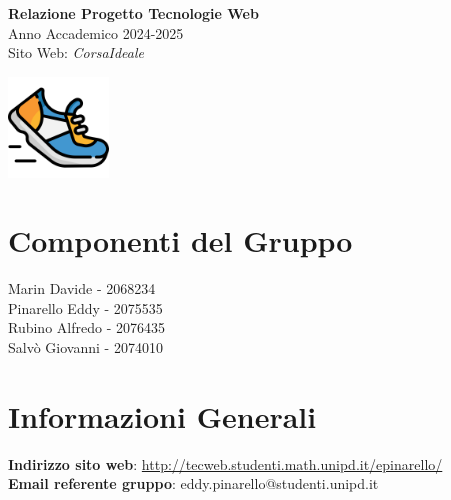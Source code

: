 \documentclass[a4paper, 12pt]{article}
\begin{document}
\begin{titlepage}
\begin{center}
    \vspace*{0.5cm}
    \Huge \textbf{Relazione Progetto Tecnologie Web} \\
    \vspace{0.5cm}
    \Large Anno Accademico 2024-2025\\
    \vspace{1cm}
    \Huge Sito Web: \textit{CorsaIdeale} \\
    \vspace{0.5cm} 

    \includegraphics[width=0.2\textwidth]{logo.png}
\end{center}

\section*{\centering Componenti del Gruppo}
\begin{center}
Marin Davide - 2068234\\
\vspace{0.2cm}
Pinarello Eddy - 2075535\\
\vspace{0.2cm}
Rubino Alfredo - 2076435\\
\vspace{0.2cm}
Salvò Giovanni - 2074010
\end{center}

\section*{\centering Informazioni Generali}
\begin{center}
\textbf{Indirizzo sito web}: \url{http://tecweb.studenti.math.unipd.it/epinarello/}\\
\vspace{0.2cm}
\textbf{Email referente gruppo}: eddy.pinarello@studenti.unipd.it
\end{center}

\renewcommand{\arraystretch}{1.5} %


\end{titlepage}
\end{document}
